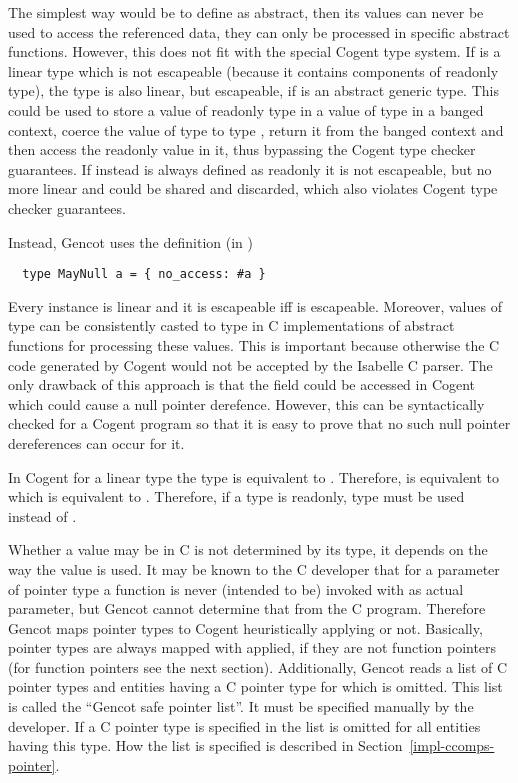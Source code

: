 The simplest way would be to define  as abstract, then its values can never be used to access the referenced
data, they can only be processed in specific abstract functions. However, this does not fit with the special Cogent type system.
If  is a linear type which is not escapeable (because it contains components of readonly type), the type 
is also linear, but escapeable, if  is an abstract generic type. This could be used to store a value of readonly
type in a value of type  in a banged context, coerce the value of type  to type , return it from
the banged context and then access the readonly value in it, thus bypassing the Cogent type checker guarantees. If 
instead is always defined as readonly it is not escapeable, but no more linear and could be shared and discarded, which also
violates Cogent type checker guarantees. 

Instead, Gencot uses the definition (in )
\begin{verbatim}
  type MayNull a = { no_access: #a }
\end{verbatim}
Every instance  is linear and it is escapeable iff  is escapeable. Moreover, values of type 
can be consistently casted to type  in C implementations of abstract functions for processing these values. This is 
important because otherwise the C code generated by Cogent would not be accepted by the Isabelle C parser. The only
drawback of this approach is that the field  could be accessed in Cogent which could cause a null pointer
derefence. However, this can be syntactically checked for a Cogent program so that it is easy to prove that no such null
pointer dereferences can occur for it.

In Cogent for a linear type  the type  is equivalent to . Therefore,  is 
equivalent to  which is equivalent to . Therefore, if a type  is readonly,
type  must be used instead of .

Whether a value may be  in C is not determined by its type, it depends on the way the value is used. It may be known
to the C developer that for a parameter of pointer type a function is never (intended to be) invoked with  as actual
parameter, but Gencot cannot determine that from the C program. Therefore Gencot maps pointer types to Cogent heuristically 
applying  or not. Basically, pointer types are always mapped with  applied, if they are not 
function pointers (for function pointers see the next section). Additionally, Gencot reads a list of C pointer types and entities 
having a C pointer type for which  is omitted. This list is called the ``Gencot safe pointer list''. It must be 
specified manually by the developer. If a C pointer type is specified in the list  is omitted for all entities 
having this type. How the list is specified is described in Section~\ref{impl-ccomps-pointer}.

